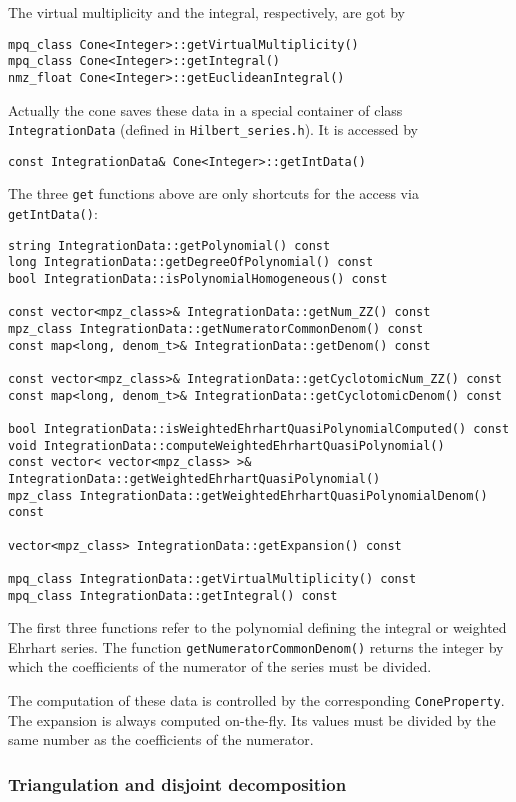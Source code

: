 \begin{small}
The virtual multiplicity and the integral, respectively, are got by
\begin{Verbatim}
mpq_class Cone<Integer>::getVirtualMultiplicity()
mpq_class Cone<Integer>::getIntegral()
nmz_float Cone<Integer>::getEuclideanIntegral()
\end{Verbatim}

Actually the cone saves these data in a special container of class \verb|IntegrationData| (defined in \verb|Hilbert_series.h|). It is accessed by
\begin{Verbatim}
const IntegrationData& Cone<Integer>::getIntData()
\end{Verbatim}
The three \verb|get| functions above are only shortcuts for the access via \verb|getIntData()|:
\begin{Verbatim}
string IntegrationData::getPolynomial() const
long IntegrationData::getDegreeOfPolynomial() const
bool IntegrationData::isPolynomialHomogeneous() const

const vector<mpz_class>& IntegrationData::getNum_ZZ() const
mpz_class IntegrationData::getNumeratorCommonDenom() const
const map<long, denom_t>& IntegrationData::getDenom() const

const vector<mpz_class>& IntegrationData::getCyclotomicNum_ZZ() const
const map<long, denom_t>& IntegrationData::getCyclotomicDenom() const

bool IntegrationData::isWeightedEhrhartQuasiPolynomialComputed() const
void IntegrationData::computeWeightedEhrhartQuasiPolynomial()
const vector< vector<mpz_class> >& IntegrationData::getWeightedEhrhartQuasiPolynomial()
mpz_class IntegrationData::getWeightedEhrhartQuasiPolynomialDenom() const

vector<mpz_class> IntegrationData::getExpansion() const

mpq_class IntegrationData::getVirtualMultiplicity() const
mpq_class IntegrationData::getIntegral() const
\end{Verbatim}

The first three functions refer to the polynomial defining the integral or weighted Ehrhart series. The function \verb|getNumeratorCommonDenom()| returns the integer by which the coefficients of the numerator of the series must be divided.

The computation of these data is controlled by the corresponding \verb|ConeProperty|. The expansion is always computed on-the-fly. Its values must be divided by the same number as the coefficients of the numerator.

\subsubsection{Triangulation and disjoint decomposition}


\end{small}

